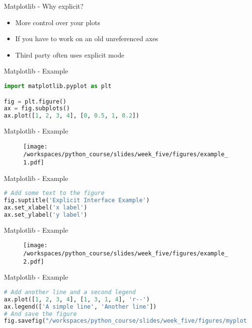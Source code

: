 \documentclass{beamer}
\begin{document}
\begin{frame}{Matplotlib - Why explicit?}
    \begin{itemize}
        \item  <1-> More control over your plots
        \item  <2-> If you have to work on an old unreferenced axes 
        \item  <3-> Third party often uses explicit mode
    \end{itemize}
\end{frame}

\begin{frame}[fragile]{Matplotlib - Example}
    \begin{lstlisting}[language=Python, backgroundcolor = \color{lightgray}]
import matplotlib.pyplot as plt

fig = plt.figure()
ax = fig.subplots()
ax.plot([1, 2, 3, 4], [0, 0.5, 1, 0.2])
    \end{lstlisting}

\end{frame}

\begin{frame}{Matplotlib - Example}
    \begin{figure}
        \centering
        \texttt{[image: /workspaces/python\_course/slides/week\_five/figures/example\_1.pdf]}
    \end{figure}
\end{frame}


\begin{frame}[fragile]{Matplotlib - Example}
    \begin{lstlisting}[language=Python, backgroundcolor = \color{lightgray}]
# Add some text to the figure
fig.suptitle('Explicit Interface Example')
ax.set_xlabel('x label')
ax.set_ylabel('y label')
    \end{lstlisting}

\end{frame}

\begin{frame}{Matplotlib - Example}
    \begin{figure}
        \centering
        \texttt{[image: /workspaces/python\_course/slides/week\_five/figures/example\_2.pdf]}
    \end{figure}
\end{frame}

\begin{frame}[fragile]{Matplotlib - Example}
    \begin{lstlisting}[language=Python, backgroundcolor = \color{lightgray},
        columns=fullflexible,
        breaklines=true,]
# Add another line and a second legend
ax.plot([1, 2, 3, 4], [1, 3, 1, 4], 'r--')
ax.legend(['A simple line', 'Another line'])
# And save the figure
fig.savefig("/workspaces/python_course/slides/week_five/figures/myplot.pdf")
    \end{lstlisting}

\end{frame}
\end{document}
